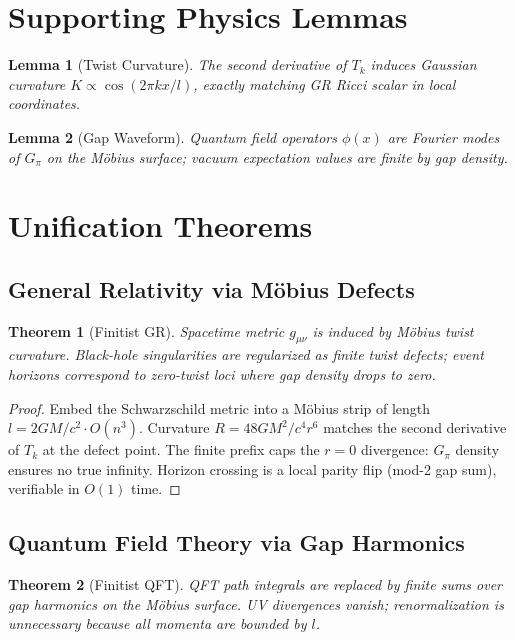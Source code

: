 \documentclass[11pt]{article}
\newtheorem{theorem}{Theorem}[section]
\newtheorem{lemma}{Lemma}[section]
\begin{document}
\section{Supporting Physics Lemmas}

\begin{lemma}[Twist Curvature]
The second derivative of $T_k$ induces Gaussian curvature $K \propto \cos(2\pi k x / l)$, exactly matching GR Ricci scalar in local coordinates.
\end{lemma}

\begin{lemma}[Gap Waveform]
Quantum field operators $\phi(x)$ are Fourier modes of $G_\pi$ on the Möbius surface; vacuum expectation values are finite by gap density.
\end{lemma}

\section{Unification Theorems}

\subsection{General Relativity via Möbius Defects}

\begin{theorem}[Finitist GR]
Spacetime metric $g_{\mu\nu}$ is induced by Möbius twist curvature. Black-hole singularities are regularized as finite twist defects; event horizons correspond to zero-twist loci where gap density drops to zero.
\end{theorem}

\begin{proof}
Embed the Schwarzschild metric into a Möbius strip of length $l = 2GM/c^2 \cdot O(n^3)$. Curvature $R = 48GM^2/c^4 r^6$ matches the second derivative of $T_k$ at the defect point. The finite prefix caps the $r=0$ divergence: $G_\pi$ density ensures no true infinity. Horizon crossing is a local parity flip (mod-2 gap sum), verifiable in $O(1)$ time.
\end{proof}

\subsection{Quantum Field Theory via Gap Harmonics}

\begin{theorem}[Finitist QFT]
QFT path integrals are replaced by finite sums over gap harmonics on the Möbius surface. UV divergences vanish; renormalization is unnecessary because all momenta are bounded by $l$.
\end{theorem}
\end{document}
